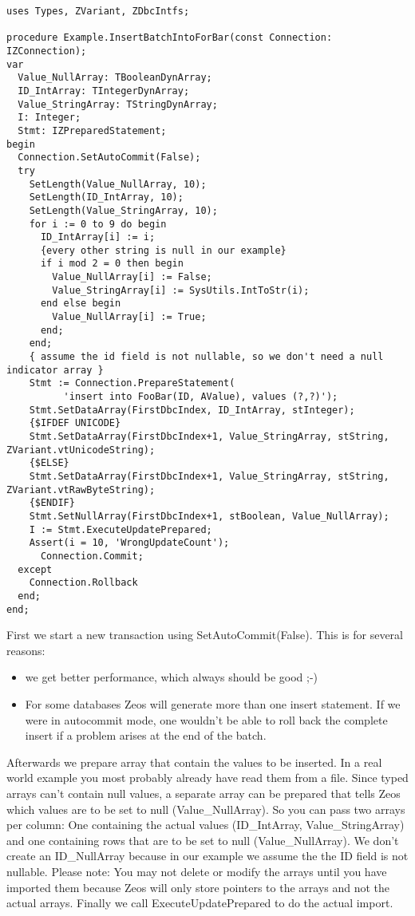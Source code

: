 \documentclass[a4paper,12pt,oneside]{article}
\begin{document}
\begin{lstlisting}
uses Types, ZVariant, ZDbcIntfs;

procedure Example.InsertBatchIntoForBar(const Connection: IZConnection);
var
  Value_NullArray: TBooleanDynArray;
  ID_IntArray: TIntegerDynArray;
  Value_StringArray: TStringDynArray;
  I: Integer;
  Stmt: IZPreparedStatement;
begin
  Connection.SetAutoCommit(False);
  try
    SetLength(Value_NullArray, 10);
    SetLength(ID_IntArray, 10);
    SetLength(Value_StringArray, 10);
    for i := 0 to 9 do begin
      ID_IntArray[i] := i;
      {every other string is null in our example}
      if i mod 2 = 0 then begin
        Value_NullArray[i] := False;
        Value_StringArray[i] := SysUtils.IntToStr(i);
      end else begin
        Value_NullArray[i] := True;
      end;
    end;
    { assume the id field is not nullable, so we don't need a null indicator array }
    Stmt := Connection.PrepareStatement(
		  'insert into FooBar(ID, AValue), values (?,?)');
    Stmt.SetDataArray(FirstDbcIndex, ID_IntArray, stInteger);
    {$IFDEF UNICODE}
    Stmt.SetDataArray(FirstDbcIndex+1, Value_StringArray, stString, ZVariant.vtUnicodeString);
    {$ELSE}
    Stmt.SetDataArray(FirstDbcIndex+1, Value_StringArray, stString, ZVariant.vtRawByteString);
    {$ENDIF}
    Stmt.SetNullArray(FirstDbcIndex+1, stBoolean, Value_NullArray);
    I := Stmt.ExecuteUpdatePrepared;
    Assert(i = 10, 'WrongUpdateCount');
	  Connection.Commit;
  except
    Connection.Rollback
  end;
end;
\end{lstlisting}

First we start a new transaction using SetAutoCommit(False).
This is for several reasons:
\begin{itemize}
\item we get better performance, which always should be good ;-)
\item
  For some databases Zeos will generate more than one insert statement.
  If we were in autocommit mode, one wouldn't be able to roll back the complete insert if a problem arises at the end of the batch.
\end{itemize}
Afterwards we prepare array that contain the values to be inserted.
In a real world example you most probably already have read them from a file.
Since typed arrays can't contain null values, a separate array can be prepared that tells Zeos which values are to be set to null (Value\_NullArray).
So you can pass two arrays per column: 
One containing the actual values (ID\_IntArray, Value\_StringArray) and one containing rows that are to be set to null (Value\_NullArray).
We don't create an ID\_NullArray because in our example we assume the the ID field is not nullable.
Please note:
You may not delete or modify the arrays until you have imported them because Zeos will only store pointers to the arrays and not the actual arrays.
Finally we call ExecuteUpdatePrepared to do the actual import.
\end{document}

